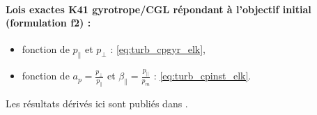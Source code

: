 {\begin{minipage}[c]{\linewidth}
\paragraph{Lois exactes K41 gyrotrope/CGL répondant à l'objectif initial (formulation f2) :} 
\begin{itemize}
    \item fonction de $p_{\parallel}$ et $p_{\perp}$ : \eqref{eq:turb_cpgyr_elk},
    \item fonction de $a_p = \frac{p_{\perp}}{p_{\parallel}}$ et $\beta_{\parallel} = \frac{p_{\parallel}}{p_m}$ : \eqref{eq:turb_cpinst_elk}.
\end{itemize}

Les résultats dérivés ici sont publiés dans \cite{simon_exact_2022}. 
\end{minipage}}
